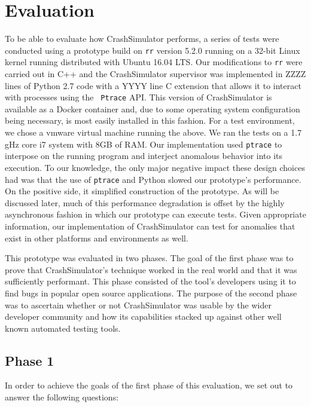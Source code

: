 \section{Evaluation}
\label{SEC:evaluation}

To be able to evaluate how CrashSimulator performs, a series of tests were
conducted using a prototype build on {\tt rr} version 5.2.0 running on a
32-bit Linux kernel running distributed with  Ubuntu 16.04 LTS.  Our
modifications to {\tt rr} were carried out in C++ and the CrashSimulator
supervisor was implemented in ZZZZ lines of Python 2.7 code with a YYYY
line C extension that allows it to interact with processes using the {\tt
Ptrace} API.  This version of CrashSimulator is available as a Docker
container and, due to some operating system configuration being necessary,
is most easily installed in this fashion.  For a test environment, we chose
a vmware virtual machine running the above.  We ran the tests on a 1.7 gHz
core i7 system with 8GB of RAM. Our implementation used {\tt ptrace} to
interpose on the running program and interject anomalous behavior into its
execution.  To our knowledge, the only major negative impact these design
choices had was that the use of {\tt ptrace} and Python slowed our
prototype's performance.  On the positive side, it simplified construction
of the prototype.  As will be discussed later, much of this performance
degradation is offset by the highly asynchronous fashion in which our
prototype can execute tests. Given appropriate information, our
implementation of CrashSimulator can test for anomalies that exist in other
platforms and environments as well.

This prototype was evaluated in two phases.  The goal of the first phase
was to prove that CrashSimulator's technique worked in the real world and
that it was sufficiently performant.  This phase consisted of
the tool's developers using it to find bugs in popular open
source applications.  The purpose of the second phase was to ascertain
whether or not CrashSimulator was usable by the wider developer community
and how its capabilities stacked up against other well known automated
testing tools.

\subsection{Phase 1}

In order to achieve the goals of the first phase of this evaluation, we set
out to answer the following questions:

